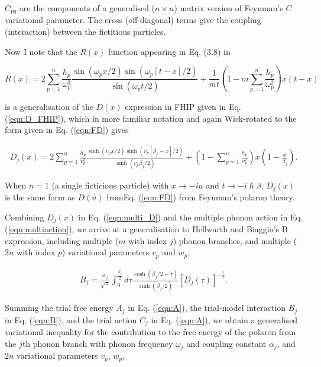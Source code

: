 $C_{pq}$ are the components of a generalised ($n \times n$) matrix version of Feynman's $C$ variational parameter. The cross (off-diagonal) terms give the coupling (interaction) between the fictitious particles. 

Now I note that the $R(x)$ function appearing in Eq. (3.8) in \cite{poulter_complete_1992} 

\begin{equation}
    R(x) = 2 \sum_{p = 1}^n \frac{h_p}{\omega_p^3} \frac{\sin(\omega_p x / 2) \sin(\omega_p [t - x] / 2)}{\sin(\omega_p t / 2)} + \frac{1}{mt} \left( 1 - m \sum_{p = 1}^n \frac{h_p}{\omega_p^2} \right) x (t - x)
\end{equation}

is a generalisation of the $D(x)$ expression in FHIP given in Eq. (\ref{eqn:D_FHIP}), which in more familiar notation and again Wick-rotated to the form given in Eq. (\ref{eqn:FD}) gives

\begin{equation}\label{eqn:multi_D}
\begin{gathered}
    D_j(x) = 2 \sum_{p=1}^n \frac{h_{p}}{v_{p}^3} \frac{\sinh{(v_{p} x/2)\sinh{(v_{p}[\beta_j-x]/2)}}}{\sinh(v_{p}\beta_j/2)}
    + \left( 1 - \sum_{p = 1}^n \frac{h_{p}}{v_{p}^2} \right) x \left(1 - \frac{x}{\beta_j}\right).
\end{gathered}
\end{equation}

When $n=1$ (a single ficticious particle) with $x \rightarrow -iu$ and $t \rightarrow -i\hslash\beta$, $D_j(x)$ is the same form as $D(u)$ fromEq. (\ref{eqn:FD}) from Feynman's polaron theory. 

Combining $D_j(x)$ in Eq. (\ref{eqn:multi_D}) and the multiple phonon action in Eq. (\ref{eqn:multiaction}), we arrive at a generalisation to Hellwarth and Biaggio's B expression, including multiple ($m$ with index $j$) phonon branches, and multiple ($2n$ with index $p$) variational parameters $v_{p}$ and $w_{p}$,

\begin{equation}
\begin{gathered}
    B_j = \frac{\alpha_j}{\sqrt{\pi}} \int_0^{\frac{\beta_j}{2}} d\tau \frac{\cosh (\beta_j / 2 - \tau)}{\sinh(\beta_j / 2)} \left[ D_j(\tau) \right]^{-\frac{1}{2}} .
\label{eqn:B}
\end{gathered}
\end{equation}

Summing the trial free energy $A_j$ in Eq. (\ref{eqn:A}), the trial-model interaction $B_j$ in Eq. (\ref{eqn:B}), and the trial action $C_j$ in Eq. (\ref{eqn:A}), we obtain a generalised variational inequality for the contribution to the free energy of the polaron from the $j$th phonon branch with phonon frequency $\omega_j$ and coupling constant $\alpha_j$, and $2n$ variational parameters $v_{p}$, $w_{p}$, 

